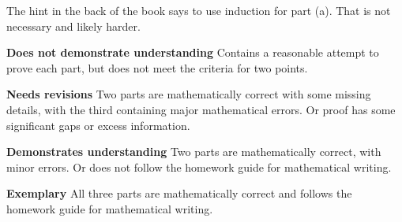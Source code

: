 \documentclass[letterpaper, 11 pt]{../ximera}
\begin{document}
\begin{problem}
    The hint in the back of the book says to use induction for part (a). That is not necessary and likely harder.%
    
    \begin{writeRubric}
        \item \textbf{Does not demonstrate understanding}
        Contains a reasonable attempt to prove each part, but does not meet the criteria for two points.
        \item \textbf{Needs revisions}
        Two parts are mathematically correct with some missing details, with the third containing major mathematical errors. Or proof has some significant gaps or excess information.
        \item \textbf{Demonstrates understanding}
        Two parts are mathematically correct, with minor errors. Or does not follow the homework guide for mathematical writing.
        \item \textbf{Exemplary}
        All three parts are mathematically correct and follows the homework guide for mathematical writing.
    \end{writeRubric}
%
\end{problem}
\end{document}
